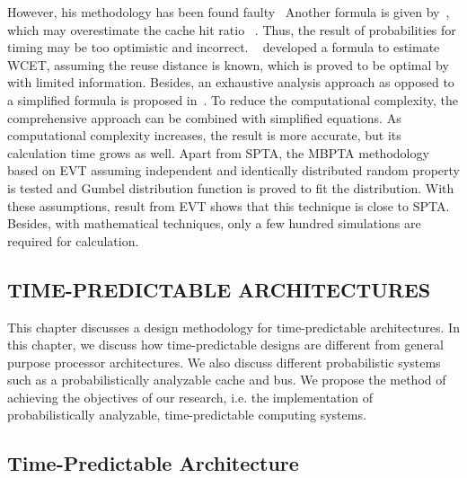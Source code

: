 However, his methodology has been found faulty~\cite{Cazorla:2013:PPA:2465787.2465796, altmeyer:spta} Another formula is given by~\cite{Kosmidis:2013:CDP:2485288.2485416}, which may overestimate the cache hit ratio ~\cite{davis:improve}. Thus, the result of probabilities for timing may be too optimistic and incorrect. ~\cite{davis2013analysis} developed a formula to estimate WCET, assuming the reuse distance is known, which is proved to be optimal by~\cite{altmeyer:spta} with limited information. Besides, an exhaustive analysis approach as opposed to a simplified formula is proposed in~\cite{altmeyer:spta}. To reduce the computational complexity, the comprehensive approach can be combined with simplified equations. As computational complexity increases, the result is more accurate, but its
calculation time grows as well.
Apart from SPTA, the MBPTA methodology based on EVT assuming independent and identically distributed random property is tested and Gumbel distribution function is proved to fit the distribution. With these assumptions, result from EVT
shows that this technique is close to SPTA. Besides, with mathematical
techniques, only a few hundred simulations are required for calculation.

\subsection{TIME-PREDICTABLE ARCHITECTURES}

This chapter discusses a design methodology for time-predictable architectures. In this chapter, we discuss how time-predictable designs are different from general purpose processor architectures. We also discuss different probabilistic systems such as a probabilistically analyzable cache and bus. We propose the method of achieving the objectives of our research, i.e. the implementation of probabilistically analyzable, time-predictable computing systems.


\subsection{Time-Predictable Architecture}


